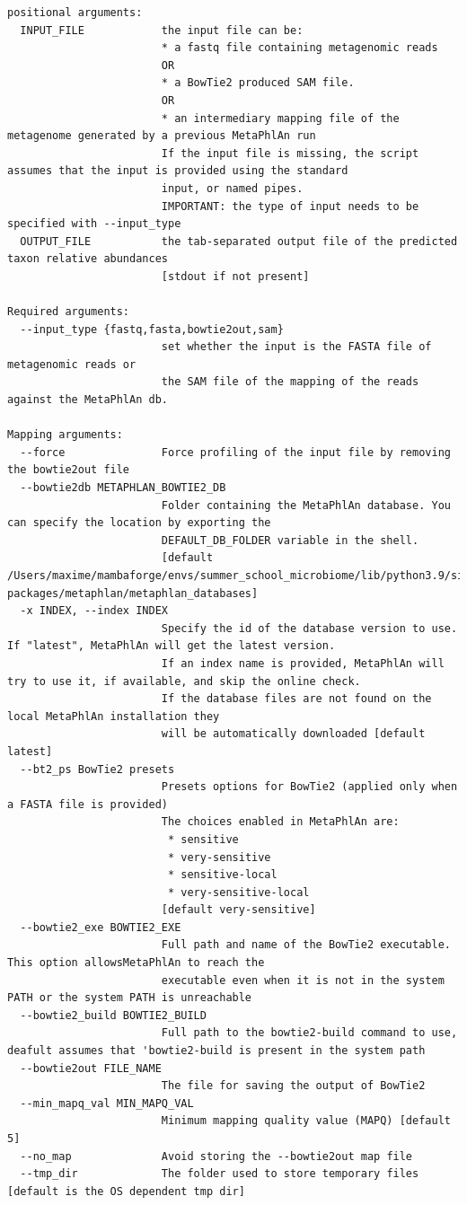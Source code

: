 \documentclass[
  letterpaper,
]{book}
\begin{document}
\begin{verbatim}
positional arguments:
  INPUT_FILE            the input file can be:
                        * a fastq file containing metagenomic reads
                        OR
                        * a BowTie2 produced SAM file.
                        OR
                        * an intermediary mapping file of the metagenome generated by a previous MetaPhlAn run
                        If the input file is missing, the script assumes that the input is provided using the standard
                        input, or named pipes.
                        IMPORTANT: the type of input needs to be specified with --input_type
  OUTPUT_FILE           the tab-separated output file of the predicted taxon relative abundances
                        [stdout if not present]

Required arguments:
  --input_type {fastq,fasta,bowtie2out,sam}
                        set whether the input is the FASTA file of metagenomic reads or
                        the SAM file of the mapping of the reads against the MetaPhlAn db.

Mapping arguments:
  --force               Force profiling of the input file by removing the bowtie2out file
  --bowtie2db METAPHLAN_BOWTIE2_DB
                        Folder containing the MetaPhlAn database. You can specify the location by exporting the
                        DEFAULT_DB_FOLDER variable in the shell.
                        [default /Users/maxime/mambaforge/envs/summer_school_microbiome/lib/python3.9/site-packages/metaphlan/metaphlan_databases]
  -x INDEX, --index INDEX
                        Specify the id of the database version to use. If "latest", MetaPhlAn will get the latest version.
                        If an index name is provided, MetaPhlAn will try to use it, if available, and skip the online check.
                        If the database files are not found on the local MetaPhlAn installation they
                        will be automatically downloaded [default latest]
  --bt2_ps BowTie2 presets
                        Presets options for BowTie2 (applied only when a FASTA file is provided)
                        The choices enabled in MetaPhlAn are:
                         * sensitive
                         * very-sensitive
                         * sensitive-local
                         * very-sensitive-local
                        [default very-sensitive]
  --bowtie2_exe BOWTIE2_EXE
                        Full path and name of the BowTie2 executable. This option allowsMetaPhlAn to reach the
                        executable even when it is not in the system PATH or the system PATH is unreachable
  --bowtie2_build BOWTIE2_BUILD
                        Full path to the bowtie2-build command to use, deafult assumes that 'bowtie2-build is present in the system path
  --bowtie2out FILE_NAME
                        The file for saving the output of BowTie2
  --min_mapq_val MIN_MAPQ_VAL
                        Minimum mapping quality value (MAPQ) [default 5]
  --no_map              Avoid storing the --bowtie2out map file
  --tmp_dir             The folder used to store temporary files [default is the OS dependent tmp dir]


\end{verbatim}
\end{document}
